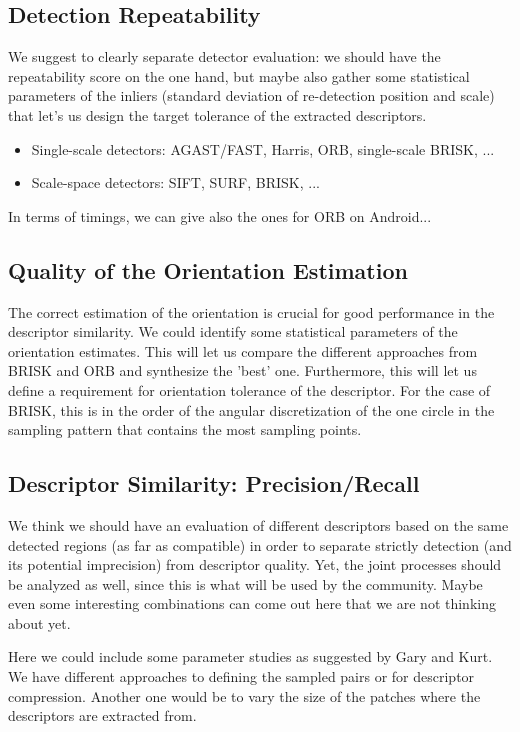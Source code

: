 \documentclass[a4paper,10pt]{article}
\begin{document}
\subsection{Detection Repeatability}
 We suggest to clearly separate detector evaluation: we should have the repeatability score on the one hand, but maybe also gather some statistical parameters of the inliers (standard deviation of re-detection position and scale) that let's us design the target tolerance of the extracted descriptors.
\begin{itemize}
\item Single-scale detectors: AGAST/FAST, Harris, ORB, single-scale BRISK, ...
\item Scale-space detectors: SIFT, SURF, BRISK, ...
\end{itemize}
In terms of timings, we can give also the ones for ORB on Android...

\subsection{Quality of the Orientation Estimation}
The correct estimation of the orientation is crucial for good performance in the descriptor similarity. We could identify some statistical parameters of the orientation estimates. This will let us compare the different approaches from BRISK and ORB and synthesize the 'best' one. Furthermore, this will let us define a requirement for orientation tolerance of the descriptor. For the case of BRISK, this is in the order of the angular discretization of the one circle in the sampling pattern that contains the most sampling points.

\subsection{Descriptor Similarity: Precision/Recall}
We think we should have an evaluation of different descriptors based on the same detected regions (as far as compatible) in order to separate strictly detection (and its potential imprecision) from descriptor quality. Yet, the joint processes should be analyzed as well, since this is what will be used by the community. Maybe even some interesting combinations can come out here that we are not thinking about yet.

Here we could include some parameter studies as suggested by Gary and Kurt. We have different approaches to defining the sampled pairs or for descriptor compression. Another one would be to vary the size of the patches where the descriptors are extracted from.
\end{document}
